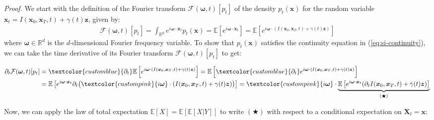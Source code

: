 \documentclass{article}
\newcommand{\bluetext}[1]{\textcolor{customblue}{#1}}
\newcommand{\pinktext}[1]{\textcolor{custompink}{#1}}
\begin{document}
\textit{Proof.} We start with the definition of the Fourier transform $\mathcal{F}(\boldsymbol{\omega},t)[p_t]$ of the density $p_t(\boldsymbol{x})$ for the random variable $\boldsymbol{x}_t=I(\boldsymbol{x}_0, \boldsymbol{x}_T,t)+\gamma(t)\boldsymbol{z}$, given by:
\begin{align}
    \mathcal{F}(\boldsymbol{\omega},t)[p_t]=\int_{\mathbb{R}^d}e^{i\boldsymbol{\omega}\cdot \boldsymbol{x}_t}p_t(\boldsymbol{x})=\mathbb{E}\left[e^{i\boldsymbol{\omega}\cdot \boldsymbol{x}_t}\right]=\mathbb{E}\left[e^{i\boldsymbol{\omega}\cdot (I(\boldsymbol{x}_0, \boldsymbol{x}_T,t) +\gamma(t)\boldsymbol{z})}\right]
\end{align}
where $\boldsymbol{\omega}\in \mathbb{R}^d$ is the $d$-dimensional Fourier frequency variable. To show that $p_t(\boldsymbol{x})$ satisfies the continuity equation in (\ref{eq:si-continuity}), we can take the time derivative of its Fourier transform $\mathcal{F}(\boldsymbol{\omega},t)[p_t]$ to get:
\begin{small}
\begin{align}
    \partial_t\mathcal{F}(\boldsymbol{\omega},t)[p_t]&=\bluetext{\partial_t}\mathbb{E}\left[e^{i\boldsymbol{\omega}\cdot (I(\boldsymbol{x}_0, \boldsymbol{x}_T,t) +\gamma(t)\boldsymbol{z})}\right]=\mathbb{E}\left[\bluetext{\partial_t}e^{i\boldsymbol{\omega}\cdot (I(\boldsymbol{x}_0, \boldsymbol{x}_T,t) +\gamma(t)\boldsymbol{z})}\right]\nonumber\\
    &=\mathbb{E}\left[e^{i\boldsymbol{\omega}\cdot \boldsymbol{x}_t}\partial_t\big(\pinktext{i\boldsymbol{\omega}}\cdot (I(\boldsymbol{x}_0, \boldsymbol{x}_T,t) +\gamma(t)\boldsymbol{z})\big)\right]=\pinktext{i\boldsymbol{\omega}}\cdot \underbrace{\mathbb{E}\left[e^{i\boldsymbol{\omega}\cdot \boldsymbol{x}_t}(\partial_tI(\boldsymbol{x}_0, \boldsymbol{x}_T,t)+\dot{\gamma}(t)\boldsymbol{z})\right]}_{(\bigstar)}
\end{align}
\end{small}
Now, we can apply the law of total expectation $\mathbb{E}[X]=\mathbb{E}[\mathbb{E}[X|Y]]$ to write $(\bigstar)$ with respect to a conditional expectation on $\boldsymbol{X}_t=\boldsymbol{x}$:
\end{document}
